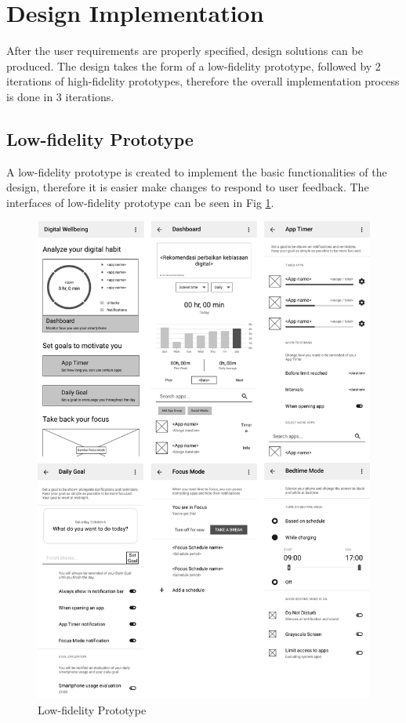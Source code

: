 \documentclass[conference]{IEEEtran}
\begin{document}
\section{Design Implementation}

After the user requirements are properly specified, design solutions can be produced. The design takes the form of a low-fidelity prototype, followed by 2 iterations of high-fidelity prototypes, therefore the overall implementation process is done in 3 iterations.

\subsection{Low-fidelity Prototype}
A low-fidelity prototype is created to implement the basic functionalities of the design, therefore it is easier make changes to respond to user feedback. The interfaces of low-fidelity prototype can be seen in Fig \ref{fig:lofi}.

\begin{figure}[htbp]
  \centerline{\includegraphics[width=0.9\linewidth]{lofi.png}}
  \caption{Low-fidelity Prototype} \label{fig:lofi}
\end{figure}
\end{document}
